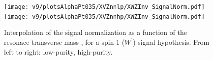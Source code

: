\begin{figure}[!htb]
  \centering
    \texttt{[image: v9/plotsAlphaPt035/XVZnnlp/XWZInv\_SignalNorm.pdf]}
    \texttt{[image: v9/plotsAlphaPt035/XVZnnhp/XWZInv\_SignalNorm.pdf]}
  \caption{Interpolation of the signal normalization as a function of the resonace transverse mass \mtVZ, for a spin-1 ($W^{'}$) signal hypothesis. From left to right: low-purity, high-purity.}
  \label{fig:XWZ_SignalNorm}
\end{figure}


\clearpage

